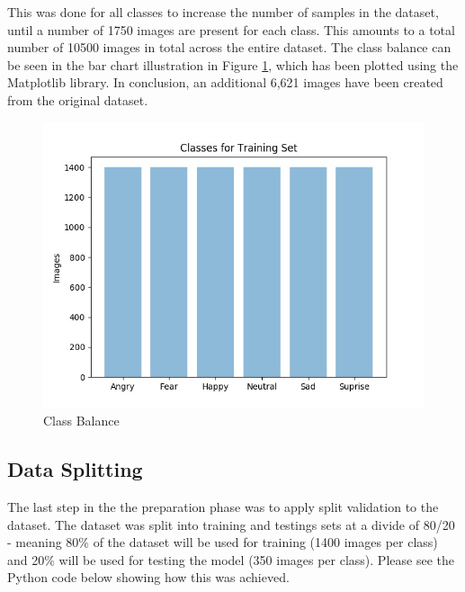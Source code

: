 This was done for all classes to increase the number of samples in the dataset, until a number of 1750 images are present for each class. This amounts to a total number of 10500 images in total across the entire dataset.  The class balance can be seen in the bar chart illustration in Figure \ref{bal}, which has been plotted using the Matplotlib library. In conclusion, an additional 6,621 images have been created from the original dataset.


\begin{figure}[ht]
	\begin{center}
		\advance\leftskip-3cm
		\advance\rightskip-3cm
		\includegraphics[keepaspectratio=true,scale=0.6]{__resources/implementation/balance.jpg}
		\caption{Class Balance}
		\label{bal}
	\end{center}
\end{figure}

\newpage

\subsection{Data Splitting}
The last step in the the preparation phase was to apply split validation to the dataset. The dataset was split into training and testings sets at a divide of 80/20 - meaning 80\% of the dataset will be used for training (1400 images per class) and 20\% will be used for testing the model (350 images per class). Please see the Python code below showing how this was achieved.

